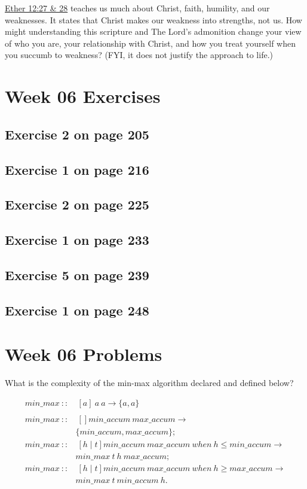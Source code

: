 \documentclass[12pt]{amsart}
\begin{document}
\href{https://www.lds.org/scriptures/bofm/ether/12.4}{Ether 12:27 \& 28} teaches us much about Christ, faith, humility, and our weaknesses. It states that Christ makes our weakness into strengths, not us. How might  understanding this scripture and The Lord\textquoteright s admonition \href{https://www.lds.org/scriptures/nt/luke/21.18-19?lang=eng&clang=eng#p17}{} change your view of who you are, your relationship with Christ, and how you treat yourself when you succumb to weakness? (FYI, it does not justify the  approach to life.)


 \section{Week 06 Exercises}
\subsection{ Exercise 2 on page 205} 
\subsection{ Exercise 1 on page 216} 
\subsection{Exercise 2 on page 225} 
\subsection{Exercise 1 on page 233} 
\subsection{Exercise 5 on page 239} 
\subsection{Exercise 1 on page 248}


\section{Week 06 Problems}

What is the complexity of the min-max algorithm declared and defined below?

\begin{align*}
min\_max\ ::&\ [a]\ a\ a\rightarrow \{a,a\}\\
\\
min\_max\ ::&\ [] min\_accum\ max\_accum\rightarrow \\
		&\{min\_accum,max\_accum\};\\
min\_max\ ::&\ [h\mid t] min\_accum\ max\_accum\ when\ h\le min\_accum\rightarrow \\
		&min\_max\ t\ h\ max\_accum;\\
min\_max\ ::&\ [h\mid t] min\_accum\ max\_accum\ when\ h\ge max\_accum\rightarrow \\
		&min\_max\ t\ min\_accum\ h.
\end{align*}
\end{document}
